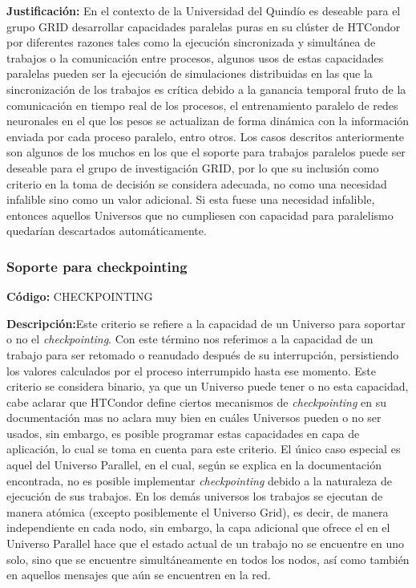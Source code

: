 \textbf{Justificación:} En el contexto de la Universidad del Quindío es deseable para el
grupo GRID desarrollar capacidades paralelas puras en su clúster de HTCondor por
diferentes razones tales como la ejecución sincronizada y simultánea de trabajos o
la comunicación entre procesos, algunos usos de estas capacidades paralelas
pueden ser la ejecución de simulaciones distribuidas en las que la sincronización de
los trabajos es crítica debido a la ganancia temporal fruto de la comunicación en
tiempo real de los procesos, el entrenamiento paralelo de redes neuronales en el
que los pesos se actualizan de forma dinámica con la información enviada por cada
proceso paralelo, entro otros. Los casos descritos anteriormente son algunos de los
muchos en los que el soporte para trabajos paralelos puede ser deseable para el
grupo de investigación GRID, por lo que su inclusión como criterio en la toma de
decisión se considera adecuada, no como una necesidad infalible sino como un
valor adicional. Si esta fuese una necesidad infalible, entonces aquellos Universos
que no cumpliesen con capacidad para paralelismo quedarían descartados
automáticamente.

\subsubsection{Soporte para checkpointing}
\textbf{Código:} CHECKPOINTING

\textbf{Descripción:}Este criterio se refiere a la capacidad de un Universo para soportar o
no el \textit{checkpointing}. Con este término nos referimos a la capacidad de un trabajo
para ser retomado o reanudado después de su interrupción, persistiendo los valores
calculados por el proceso interrumpido hasta ese momento. Este criterio se
considera binario, ya que un Universo puede tener o no esta capacidad, cabe aclarar
que HTCondor define ciertos mecanismos de \textit{checkpointing} en su documentación
mas no aclara muy bien en cuáles Universos pueden o no ser usados, sin embargo,
es posible programar estas capacidades en capa de aplicación, lo cual se toma en
cuenta para este criterio. El único caso especial es aquel del Universo Parallel, en
el cual, según se explica en la documentación encontrada, no es posible
implementar \textit{checkpointing} debido a la naturaleza de ejecución de sus trabajos. En
los demás universos los trabajos se ejecutan de manera atómica (excepto
posiblemente el Universo Grid), es decir, de manera independiente en cada nodo,
sin embargo, la capa adicional que ofrece el \MPI en el Universo Parallel hace que
el estado actual de un trabajo no se encuentre en uno solo, sino que se encuentre
simultáneamente en todos los nodos, así como también en aquellos mensajes que
aún se encuentren en la red.


